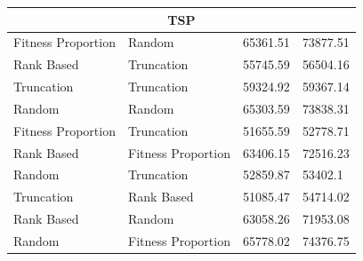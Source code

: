 \documentclass[11pt, letterpaper]{article}
\begin{document}
\begin{table}[ht]
\begin{tabular}{|l|l|l|l|}
        \multicolumn{4}{|c|}{\textbf{TSP}} \\ \hline
        Fitness Proportion & Random & 65361.51 & 73877.51 \\ \hline
        Rank Based & Truncation & 55745.59 & 56504.16 \\ \hline
        Truncation & Truncation & 59324.92 & 59367.14 \\ \hline
        Random & Random & 65303.59 & 73838.31 \\ \hline
        Fitness Proportion & Truncation & 51655.59 & 52778.71 \\ \hline
        Rank Based & Fitness Proportion & 63406.15 & 72516.23 \\ \hline
        Random & Truncation & 52859.87 & 53402.1 \\ \hline
        Truncation & Rank Based & 51085.47 & 54714.02 \\ \hline
        Rank Based & Random & 63058.26 & 71953.08 \\ \hline
        Random & Fitness Proportion & 65778.02 & 74376.75 \\ \hline
    \end{tabular}
\end{table}
\end{document}
